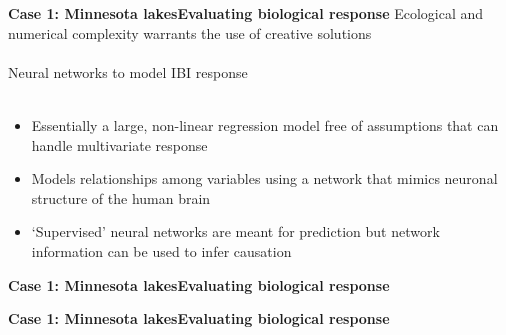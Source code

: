 \documentclass[serif]{beamer}\usepackage[]{graphicx}\usepackage[]{color}
\begin{document}
\begin{frame}{\textbf{Case 1: Minnesota lakes}}{\textbf{Evaluating biological response}}
\onslide<+->
Ecological and numerical complexity warrants the use of creative solutions\\~\\
Neural networks to model IBI response\\~\\
\begin{itemize}
\onslide<+->
\item{Essentially a large, non-linear regression model free of assumptions that can handle multivariate response}
\onslide<+->
\item{Models relationships among variables using a network that mimics neuronal structure of the human brain}
\onslide<+->
\item{`Supervised' neural networks are meant for prediction but network information can be used to infer causation}
\end{itemize}
\end{frame}

\begin{frame}{\textbf{Case 1: Minnesota lakes}}{\textbf{Evaluating biological response}}
\begin{center}
\end{center}
\end{frame}

\begin{frame}{\textbf{Case 1: Minnesota lakes}}{\textbf{Evaluating biological response}}
\begin{center}
\end{center}
\end{frame}
\end{document}

